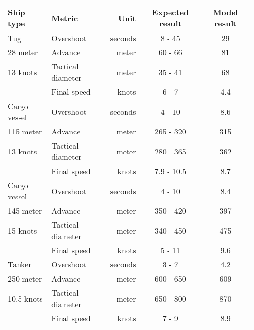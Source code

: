 \begin{table}[hp]
	\centering
	\begin{tabular}{l|l r|c|c}
		\toprule
		Ship type & Metric & Unit & Expected result & Model result \\
		\midrule
		Tug     & Overshoot & seconds & 8 - 45 & 29 \\
		28 meter & Advance & meter & 60 - 66 & 81 \\
		13 knots & Tactical diameter & meter & 35 - 41 & 68 \\
		& Final speed & knots & 6 - 7 & 4.4 \\
		\midrule
		Cargo vessel     & Overshoot & seconds & 4 - 10 & 8.6 \\
		115 meter & Advance & meter & 265 - 320 & 315 \\
		13 knots & Tactical diameter & meter & 280 - 365 & 362 \\
		& Final speed & knots & 7.9 - 10.5 & 8.7 \\
		\midrule
		Cargo vessel & Overshoot & seconds & 4 - 10 & 8.4 \\
		145 meter & Advance & meter & 350 - 420 & 397 \\
		15 knots & Tactical diameter & meter & 340 - 450 & 475\\
		& Final speed & knots & 5 - 11 & 9.6 \\
		\midrule
		Tanker     & Overshoot & seconds & 3 - 7 & 4.2 \\
		250 meter & Advance & meter & 600 - 650 & 609 \\
		10.5 knots & Tactical diameter & meter & 650 - 800 & 870 \\
		& Final speed & knots & 7 - 9 & 8.9 \\
		\bottomrule
	\end{tabular}
	
	\label{tab:validation-model}
\end{table}

\afterpage{\clearpage}

\newpage

